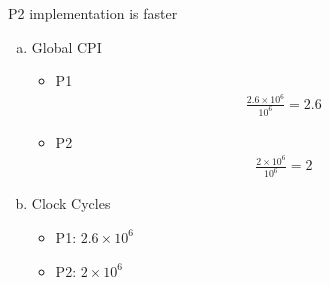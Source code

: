 \documentclass{article}
\def\math#1{$#1$}
\begin{document}
P2 implementation is faster

\begin{enumerate}[(a)]
    \item Global CPI
        \begin{itemize}
            \item P1 
                \begin{equation}
                    \begin{split}
                       \frac{2.6 \times 10^6}{10^6} = 2.6
                    \end{split}
                \end{equation}
            \item P2
                \begin{equation}
                    \begin{split}
                       \frac{2 \times 10^6}{10^6} = 2
                    \end{split}
                \end{equation}
        \end{itemize}
    \item Clock Cycles
        \begin{itemize}
            \item P1: \math{2.6 \times 10^6}
            \item P2: \math{2 \times 10^6}
        \end{itemize}
\end{enumerate}
\end{document}
